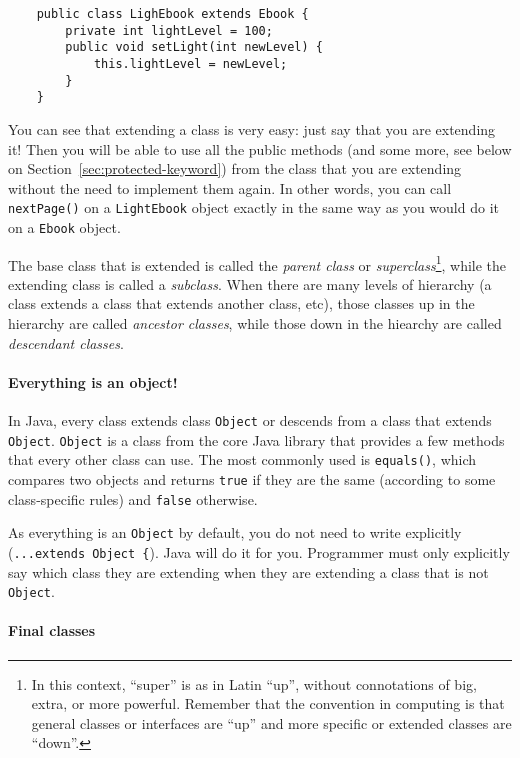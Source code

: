 \begin{verbatim}
    public class LighEbook extends Ebook {
        private int lightLevel = 100;
        public void setLight(int newLevel) {
            this.lightLevel = newLevel;
        }
    }
\end{verbatim}

You can see that extending a class is very easy: just say that you are
extending it! Then you will be able to use all the public methods (and
some more, see below on Section~\ref{sec:protected-keyword}) from
the class that you are extending without the need to implement them
again. In other words, you can call \verb+nextPage()+ on a
\verb+LightEbook+ object exactly in the same way as you would do it
on a \verb+Ebook+ object. 

The base class that is extended is called the \emph{parent class} or
\emph{superclass}\footnote{In this context, ``super'' is as in Latin
  ``up'', without connotations of big, extra, or more
  powerful. Remember that the convention in computing is that general
  classes or interfaces are ``up'' and more specific or extended classes
  are ``down''.}, 
while the extending class is called a \emph{subclass}. When there are
many levels of hierarchy (a class extends a class that extends another
class, etc), those classes up in the hierarchy are called
\emph{ancestor classes}, while those down in the hiearchy are called
\emph{descendant classes}. 

\paragraph{Everything is an object!}
\label{sec:everything-an-object}

In Java, every class extends class \verb+Object+ or descends from a
class that extends \verb+Object+. \verb+Object+ is a class from the
core Java library that provides a few methods that every other class
can use. The most commonly used is \verb+equals()+, which compares two
objects and returns \verb+true+ if they are the same (according to
some class-specific rules) and \verb+false+ otherwise. 

As everything is an \verb+Object+ by default, you do not need to write
explicitly (\verb+...extends Object {+). Java will do it for
you. Programmer must only explicitly say which class they are
extending when they are extending a class that is not \verb+Object+.

\paragraph{Final classes}
\label{sec:final-classes}

